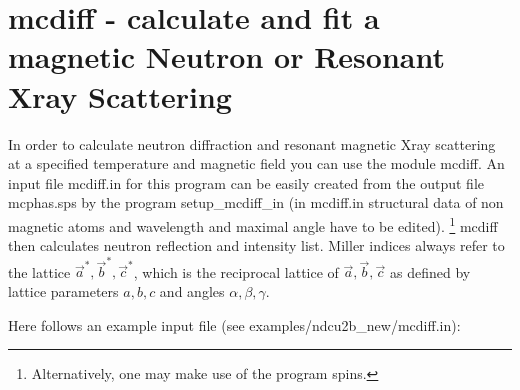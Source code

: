 \section{{\prg mcdiff} - calculate and fit a magnetic Neutron or Resonant Xray %
Scattering}\label{mcdiff}

In order to calculate neutron diffraction and resonant magnetic Xray scattering
at a specified temperature and magnetic field you can use the module {\prg mcdiff}.
An input file {\prg mcdiff.in } for this program can be easily created from
the output file {\prg mcphas.sps} by the program {\prg setup\_mcdiff\_in}
(in {\prg mcdiff.in } structural data of non magnetic atoms and wavelength
                        and maximal angle have to be edited).
\footnote{Alternatively, one may make use of the program {\prg spins}.} 
{\prg mcdiff} then calculates neutron reflection and intensity list.
Miller indices always refer to the lattice $\vec a^*, \vec b^*, \vec c^*$, which
is the reciprocal lattice of $\vec a, \vec b, \vec c$ as defined by lattice
parameters $a,b,c$ and angles $\alpha,\beta,\gamma$.

Here follows an example input file (see examples/ndcu2b\_new/mcdiff.in):

